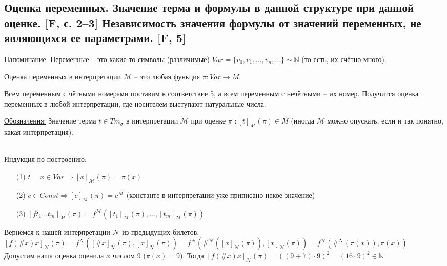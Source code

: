 \documentclass[a4paper, fleqn]{article}
\begin{document}
    \subsection{Оценка переменных. Значение терма и формулы в данной структуре при данной оценке. [F, с. 2–3] Независимость значения формулы от значений переменных, не являющихся ее параметрами. [F, 5]}
    \underline{Напоминание:} Переменные -- это какие-то символы (различимые) 
    $Var = \{v_0, v_1, \ldots, v_n, \ldots\} ∼ ℕ$ (то есть, их счётно много).
    \begin{definition}
        Оценка переменных в интерпретации $\mathcal{M}$ -- это любая функция
        $\pi: Var → M$.
    \end{definition}
    \begin{example}
        Всем переменным с чётными номерами поставим в соответствие 5, а
        всем переменным с нечётными -- их номер. 
        Получится оценка переменных в любой интерпретации, где носителем 
        выступают натуральные числа.  
    \end{example}
    \underline{Обозначения:} Значение терма $t ∈ Tm_{\sigma}$ в интерпретации
    $\mathcal{M}$ при оценке $\pi$ $: [t]_{\mathcal{M}}(\pi) ∈ M$ 
    (иногда $\mathcal{M}$ можно опускать, если и так понятно, какая 
    интерпретация).
    \begin{definition} \ \\
        Индукция по построению:  
        \begin{itemize}
            \item[(1)] $ t = x ∈ Var ⇒ [x]_{\mathcal{M}}(\pi) = \pi(x)$
            \item[(2)] $c ∈ Const ⇒ [c]_{\mathcal{M}}(\pi) = c^{\mathcal{M}}$
            (константе в интерпретации уже приписано некое значение)
            \item[(3)] $[ft_1\ldots t_m]_{\mathcal{M}}(\pi) = 
            f^{\mathcal{M}}([t_1]_{\mathcal{M}}(\pi), \ldots, 
            [t_m]_{\mathcal{M}}(\pi))$  
        \end{itemize}
    \end{definition}
    \begin{example}
        Вернёмся к нашей интерпретации $\mathcal{N}$ из предыдущих билетов. \\[9.5pt]
        $[f(\#  x)x]_{\mathcal{N}}(\pi) =
        f^{\mathcal{N}}([\# x]_{\mathcal{N}}(\pi), 
        [x]_{\mathcal{N}}(\pi)) =
        f^{\mathcal{N}}(\#^{\mathcal{N}}([x]_{\mathcal{N}}(\pi)), 
        [x]_{\mathcal{N}}(\pi)) =
        f^{\mathcal{N}}(\#^{\mathcal{N}}(\pi(x)), \pi(x))$ \\[9.5pt]
        Допустим наша оценка оценила $x$ числом 9 ($\pi(x) = 9$). Тогда 
        $[f(\#  x)x]_{\mathcal{N}}(\pi) = ((9 + 7) \cdot 9)^2 = (16 \cdot 9)^2 ∈ \mathbb{N}$
    \end{example}
\end{document}
